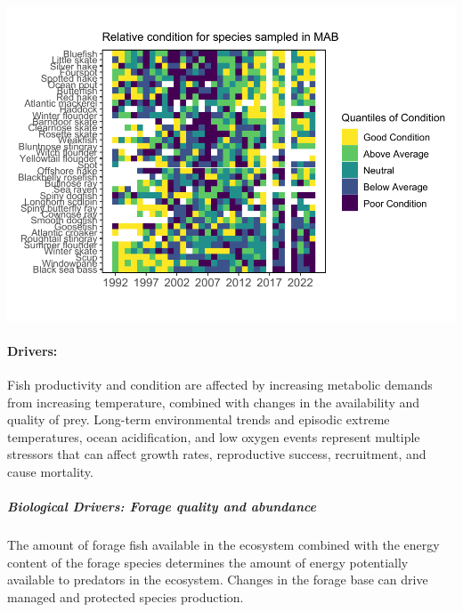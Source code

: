 \documentclass[
  10pt,
]{article}
\let\origfigure\figure
\let\endorigfigure\endfigure
\renewenvironment{figure}[1][2] {
    \expandafter\origfigure\expandafter[H]
} {
    \endorigfigure
}
\begin{document}
\begin{figure}

{\centering \includegraphics{midatlantic_files/figure-latex/mab-cf-1} 

}

\caption{Condition factor for fish species in the MAB based on fall NEFSC bottom trawl survey data. MAB data are missing for 2017 due to survey delays, and no survey was conducted in 2020.}\label{fig:mab-cf}
\end{figure}

\paragraph{Drivers:}\label{drivers-2}

Fish productivity and condition are affected by increasing metabolic demands from increasing temperature, combined with changes in the availability and quality of prey. Long-term environmental trends and episodic extreme temperatures, ocean acidification, and low oxygen events represent multiple stressors that can affect growth rates, reproductive success, recruitment, and cause mortality.

\subparagraph{Biological Drivers: Forage quality and abundance}\label{biological-drivers-forage-quality-and-abundance}

The amount of forage fish available in the ecosystem combined with the energy content of the forage species determines the amount of energy potentially available to predators in the ecosystem. Changes in the forage base can drive managed and protected species production.
\end{document}
